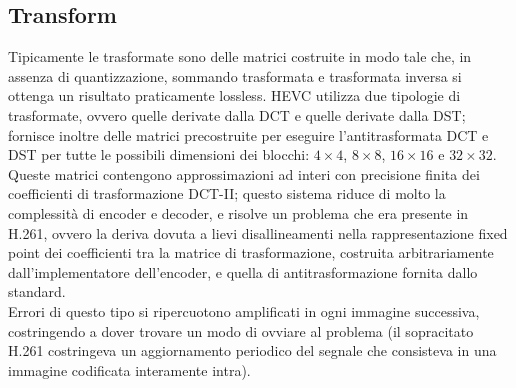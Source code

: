 \subsection{Transform}
Tipicamente le trasformate sono delle matrici costruite in modo tale che, in 
assenza di quantizzazione, sommando trasformata e trasformata inversa si 
ottenga un risultato praticamente lossless.
HEVC utilizza due tipologie di trasformate, ovvero quelle derivate dalla DCT e
quelle derivate dalla DST; fornisce inoltre delle matrici precostruite per 
eseguire l'antitrasformata DCT e DST per tutte le possibili dimensioni dei 
blocchi: $4{\times}4$, $8{\times}8$, $16{\times}16$ e $32{\times}32$.
Queste matrici contengono approssimazioni ad interi con precisione finita dei 
coefficienti di trasformazione DCT-II; questo sistema riduce di molto la 
complessità di encoder e decoder, e risolve un problema che era presente in 
H.261, ovvero la deriva dovuta a lievi disallineamenti nella rappresentazione 
fixed point dei coefficienti tra la matrice di trasformazione, costruita 
arbitrariamente dall'implementatore dell'encoder, e quella di antitrasformazione
fornita dallo standard. \\
Errori di questo tipo si ripercuotono amplificati in ogni immagine successiva, 
costringendo a dover trovare un modo di ovviare al problema (il sopracitato 
H.261 costringeva un aggiornamento periodico del segnale che consisteva in una 
immagine codificata interamente intra).


